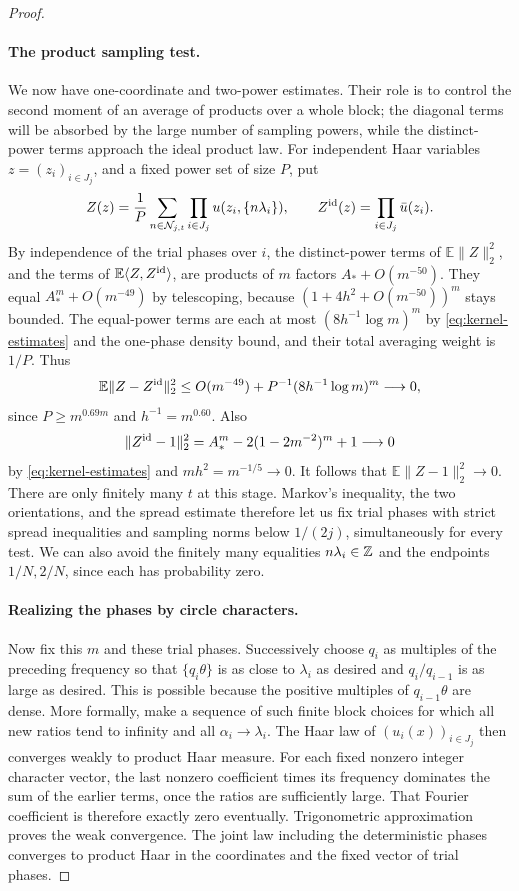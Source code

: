 \begin{proof}
\paragraph{The product sampling test.}
We now have one-coordinate and two-power estimates.  Their role is to
control the second moment of an average of products over a whole block;
the diagonal terms will be absorbed by the large number of sampling
powers, while the distinct-power terms approach the ideal product law.
For independent Haar variables $z=(z_i)_{i\in J_j}$, and a fixed power
set of size $P$, put
\[
 Z(z)=\frac1P\sum_{n\in\mathcal N_{j,t}}
                 \prod_{i\in J_j}u(z_i,\{n\lambda_i\}),
 \qquad Z^{\rm id}(z)=\prod_{i\in J_j}\bar u(z_i).
\]
By independence of the trial phases over $i$, the distinct-power terms
of $\mathbb E\|Z\|_2^2$, and the terms of
$\mathbb E\langle Z,Z^{\rm id}\rangle$, are products of $m$ factors
$A_*+O(m^{-50})$.  They equal $A_*^m+O(m^{-49})$ by telescoping,
because $(1+4h^2+O(m^{-50}))^m$ stays bounded.
The equal-power terms are each at most $(8h^{-1}\log m)^m$ by
\eqref{eq:kernel-estimates} and the one-phase density bound, and their
total averaging weight is $1/P$.  Thus
\[
 \mathbb E\|Z-Z^{\rm id}\|_2^2
 \le O(m^{-49})+P^{-1}(8h^{-1}\log m)^m\longrightarrow0,
\]
since $P\ge m^{0.69m}$ and $h^{-1}=m^{0.60}$.
Also
\[
 \|Z^{\rm id}-1\|_2^2
 =A_*^m-2(1-2m^{-2})^m+1\longrightarrow0
\]
by \eqref{eq:kernel-estimates} and $mh^2=m^{-1/5}\to0$.
It follows that $\mathbb E\|Z-1\|_2^2\to0$.
There are only finitely many $t$ at this stage.  Markov's inequality,
the two orientations, and the spread estimate therefore let us fix
trial phases with strict spread inequalities and sampling norms below
$1/(2j)$, simultaneously for every test.  We can also avoid the finitely
many equalities $n\lambda_i\in\mathbb Z$ and the endpoints $1/N,2/N$, since
each has probability zero.

\paragraph{Realizing the phases by circle characters.}
Now fix this $m$ and these trial phases.  Successively choose $q_i$ as
multiples of the preceding frequency so that $\{q_i\theta\}$ is as
close to $\lambda_i$ as desired and $q_i/q_{i-1}$ is as large as
desired.  This is possible because the positive multiples of
$q_{i-1}\theta$ are dense.  More formally, make a sequence of such
finite block choices for which all new ratios tend to infinity and
all $\alpha_i\to\lambda_i$.  The Haar law of
$(u_i(x))_{i\in J_j}$ then converges weakly to product Haar measure.
For each fixed nonzero integer character vector, the last nonzero
coefficient times its frequency dominates the sum of the earlier
terms, once the ratios are sufficiently large.  That Fourier
coefficient is therefore exactly zero eventually.  Trigonometric
approximation proves the weak convergence.  The joint law including
the deterministic phases converges to product Haar in the coordinates
and the fixed vector of trial phases.


\end{proof}
